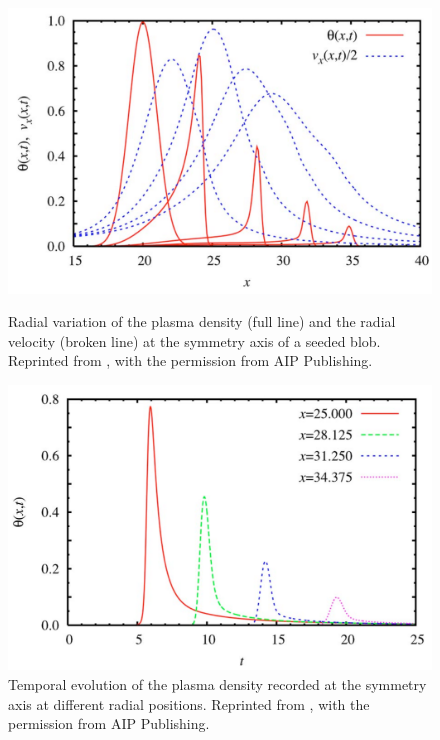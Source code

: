 \begin{figure}
	\centering
	\begin{minipage}{.48\linewidth}
		\includegraphics[width=\linewidth]{figures/garcia_blob_1.png}
		\caption{Radial variation of the plasma density (full line) and the radial velocity (broken line) at the symmetry axis of a seeded blob. Reprinted from \cite{garcia2005mechanism}, with the permission from AIP Publishing.}
		\label{Fig:garcia_1}
	\end{minipage}
	\hfill
	\begin{minipage}{.48\linewidth}
		\includegraphics[width=\linewidth]{figures/garcia_blob_2.png}
		\caption{Temporal evolution of the plasma density recorded at the symmetry axis at different radial positions. Reprinted from \cite {garcia2005mechanism}, with the permission from AIP Publishing.}
		\label{Fig:garcia_2}
	\end{minipage}
\end{figure}


